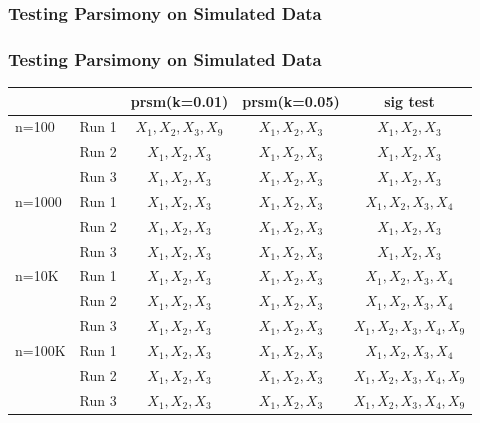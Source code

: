 \documentclass{beamer}
\begin{document}

\author[Thomas Provan]{C. Patton, A. Rumbaugh, T. Provan, O. Prilepova, J. Chen}

\begin{frame}
\frametitle{Testing Parsimony on Simulated Data}
\end{frame}

\begin{frame}
\frametitle{Testing Parsimony on Simulated Data}

\begin{tabular}{| l  r | c | c | c |}

\hline

	&&	prsm(k=0.01)&	prsm(k=0.05)&	sig test	\\
\hline

n=100&	Run 1&	$X_1 ,X_2, X_3, X_9$&	$X_1, X_2, X_3$&		$X_1, X_2, X_3$	\\
	&	Run 2&	$X_1, X_2, X_3$&		$X_1, X_2, X_3$&		$X_1, X_2, X_3$	\\
	&	Run 3&	$X_1, X_2, X_3$&		$X_1, X_2, X_3$&		$X_1, X_2, X_3$	\\

\hline

n=1000&	Run 1&	$X_1, X_2, X_3$&		$X_1, X_2, X_3$&		$X_1, X_2, X_3, X_4$	\\
	&	Run 2&	$X_1, X_2, X_3$&		$X_1, X_2, X_3$&		$X_1, X_2, X_3$		\\
	&	Run 3&	$X_1, X_2, X_3$&		$X_1, X_2, X_3$&		$X_1, X_2, X_3$		\\
	
\hline
			
n=10K&	Run 1&	$X_1, X_2, X_3$&		$X_1, X_2, X_3$&		$X_1, X_2, X_3, X_4$		\\
	&	Run 2&	$X_1, X_2, X_3$&		$X_1, X_2, X_3$&		$X_1, X_2, X_3, X_4$		\\
	&	Run 3&	$X_1, X_2, X_3$&		$X_1, X_2, X_3$&		$X_1, X_2, X_3, X_4, X_9$		\\

\hline
			
n=100K&	Run 1&	$X_1, X_2, X_3$&		$X_1, X_2, X_3$&		$X_1, X_2, X_3, X_4$		\\
	&	Run 2&	$X_1, X_2, X_3$&		$X_1, X_2, X_3$&		$X_1, X_2, X_3, X_4, X_9$		\\
	&	Run 3&	$X_1, X_2, X_3$&		$X_1, X_2, X_3$&		$X_1, X_2, X_3, X_4, X_9$		\\

\hline

\end{tabular}


\end{frame}
\end{document}
